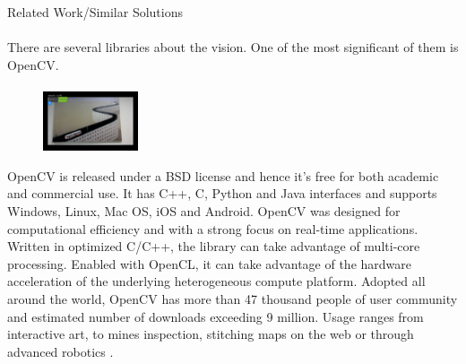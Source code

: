 \documentclass[12pt, a4paper]{article} \pagenumbering{gobble}
\begin{document}
\begin{section}{Related Work/Similar Solutions}
\paragraph{}{
  There are several libraries about the vision. One of the most significant of them is OpenCV.
}

  \paragraph{}{
  \begin{figure}
    \centering
    \includegraphics[width=0.25\textwidth]{opencv.png}
\end{figure}

OpenCV is released under a BSD license and hence it’s free for
both academic and commercial use. It has C++, C, Python and Java interfaces and supports Windows, Linux, Mac OS,
iOS and Android. OpenCV was designed for computational efficiency and with a strong focus on real-time applications.
Written in optimized C/C++, the library can take advantage of multi-core processing. Enabled with OpenCL, it can
take advantage of the hardware acceleration of the underlying heterogeneous compute platform. Adopted all around
the world, OpenCV has more than 47 thousand people of user community and estimated number of downloads exceeding 9
million. Usage ranges from interactive art, to mines inspection, stitching maps on the web or through advanced
robotics \cite{opencv}.

  }


\end{section}
\end{document}
